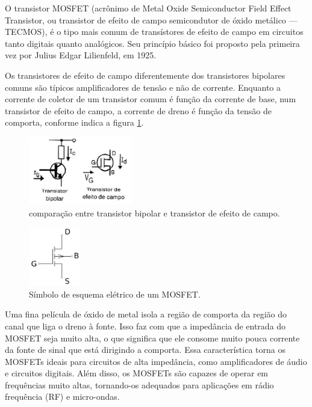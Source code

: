 \documentclass[12pt]{article}
\begin{document}
    O transistor MOSFET (acrônimo de Metal Oxide Semiconductor Field Effect Transistor, ou transistor de efeito de campo semicondutor de óxido metálico — TECMOS), é o tipo mais comum de transístores de efeito de campo em circuitos tanto digitais quanto analógicos. Seu princípio básico foi proposto pela primeira vez por Julius Edgar Lilienfeld, em 1925. 

    Os transistores de efeito de campo diferentemente dos transistores bipolares comuns são típicos amplificadores de tensão e não de corrente. Enquanto a corrente de coletor de um transistor comum é função da corrente de base, num transistor de efeito de campo, a corrente de dreno é função da tensão de comporta, conforme indica a figura \ref{fig:comparacao}.

        \begin{figure}[htpb!]
            
            \centering
            \includegraphics[width=0.4\textwidth]{./images/transisCampo.jpg}
            \caption{comparação entre transistor bipolar e transistor de efeito de campo.}
            \label{fig:comparacao}

        \end{figure}

        \begin{figure}[htpb!]
            
            \centering
            \includegraphics[width=0.2\textwidth]{./images/Mosfet-wp.svg.png}
            \caption{Símbolo de esquema elétrico de um MOSFET.}

        \end{figure}
        
    Uma fina película de óxido de metal isola a região de comporta da região do canal que liga o dreno à fonte. Isso faz com que a impedância de entrada do MOSFET seja muito alta, o que significa que ele consome muito pouca corrente da fonte de sinal que está dirigindo a comporta. Essa característica torna os MOSFETs ideais para circuitos de alta impedância, como amplificadores de áudio e circuitos digitais. Além disso, os MOSFETs são capazes de operar em frequências muito altas, tornando-os adequados para aplicações em rádio frequência (RF) e micro-ondas.
\end{document}
